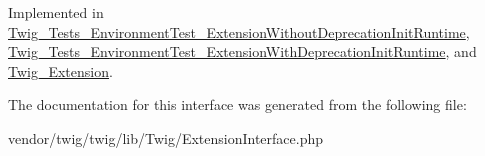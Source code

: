 Implemented in \hyperlink{classTwig__Tests__EnvironmentTest__ExtensionWithoutDeprecationInitRuntime_a3a3b623880ff4840e7a0c7186687a44b}{Twig\+\_\+\+Tests\+\_\+\+Environment\+Test\+\_\+\+Extension\+Without\+Deprecation\+Init\+Runtime}, \hyperlink{classTwig__Tests__EnvironmentTest__ExtensionWithDeprecationInitRuntime_a1364e2c891ff8ca5b2fab3ae664d6fa6}{Twig\+\_\+\+Tests\+\_\+\+Environment\+Test\+\_\+\+Extension\+With\+Deprecation\+Init\+Runtime}, and \hyperlink{classTwig__Extension_af923cb6771b0d2df5d623af14d8fa3b2}{Twig\+\_\+\+Extension}.



The documentation for this interface was generated from the following file\+:\begin{DoxyCompactItemize}
\item 
vendor/twig/twig/lib/\+Twig/Extension\+Interface.\+php\end{DoxyCompactItemize}
